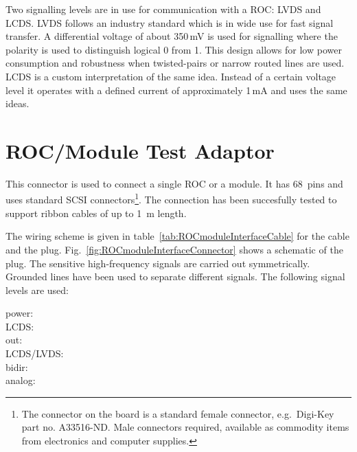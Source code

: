 Two signalling levels are in use for communication with a \gls{ROC}: \gls{LVDS} and \gls{LCDS}. \gls{LVDS} follows an industry standard \cite{wikiLVDS} which is in wide use for fast signal transfer. A differential voltage of about 350\,mV is used for signalling where the polarity is used to distinguish logical 0 from 1. This design allows for low power consumption and robustness when twisted-pairs or narrow routed lines are used. \gls{LCDS} is a custom interpretation of the same idea. Instead of a certain voltage level it operates with a defined current of approximately 1\,mA and uses the same ideas.


\section{ROC/Module Test Adaptor} \label{sec:ROCadapter}

This connector is used to connect a single \gls{ROC} or a module. It has 68~pins and uses standard SCSI connectors\footnote{The connector on the board is a standard female connector, e.g.~Digi-Key part no. A33516-ND. Male connectors required, available as commodity items from electronics and computer supplies.}. The connection has been succesfully tested to support ribbon cables of up to 1~m length.


The wiring scheme is given in table~\ref{tab:ROCmoduleInterfaceCable} for the cable and the plug. Fig.~\ref{fig:ROCmoduleInterfaceConnector} shows a schematic of the plug. The sensitive high-frequency signals are carried out symmetrically. Grounded lines have been used to separate different signals. The following signal levels are used:

\begin{description}
    \item[power:]
    \item[LCDS:]
    \item[out:]
    \item[LCDS/LVDS:]
    \item[bidir:]
    \item[analog:]
\end{description}

